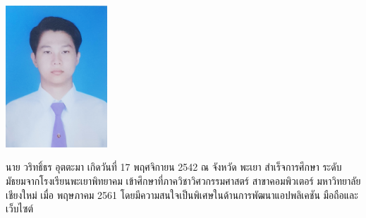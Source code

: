 \documentclass[final]{cpecmu}
\author{นายวริทธิ์ธร อุตตะมา}{Waritthon Auttama}{610610612}
\begin{document}


\pagestyle{empty}\cleardoublepage
\normalspacing \setcounter{page}{1}  \pagestyle{cpecmu}





\ifproject

\fi



\ifproject
\appendix


\ifglossary\glossarypage\fi

\ifindex\indexpage\fi

\begin{biosketch}
\begin{center}
  \includegraphics[width=1.5in]{./image/profile.jpg}
\end{center}
นาย วริทธิ์ธร อุตตะมา เกิดวันที่ 17 พฤศจิกายน 2542 ณ จังหวัด พะเยา สำเร็จการศึกษา
ระดับมัธยมจากโรงเรียนพะเยาพิทยาคม เข้าศึกษาที่ภาควิชาวิศวกรรมศาสตร์ สาขาคอมพิวเตอร์
มหาวิทยาลัยเชียงใหม่ เมื่อ พฤษภาคม 2561 โดยมีความสนใจเป็นพิเศษในด้านการพัฒนาแอปพลิเคชัน
มือถือและเว็บไซต์

\end{biosketch}
\fi %
\end{document}
